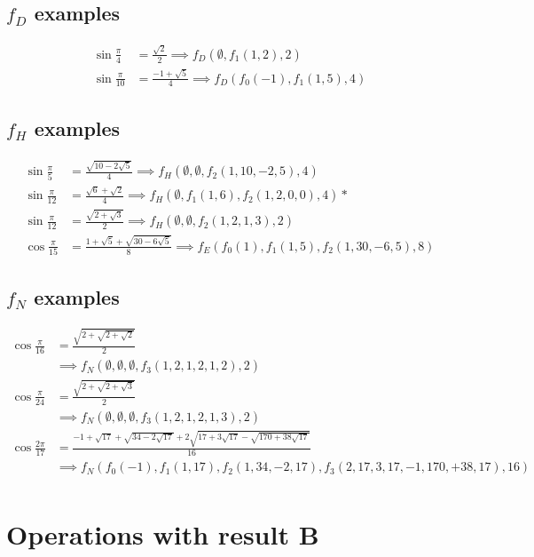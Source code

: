\documentclass{article}
\begin{document}
\subsection{$f_D$ examples}
\begin{align}
\sin{\frac{\pi}{4}}  &= \frac{\sqrt{2}}{2}    \implies f_D(\emptyset,f_1(1,2),2)\\
\sin{\frac{\pi}{10}} &= \frac{-1+\sqrt{5}}{4} \implies f_D(f_0(-1),f_1(1,5),4)
\end{align}

\subsection{$f_H$ examples}
\begin{align}
\sin{\frac{\pi}{5}}  &= \frac{\sqrt{10-2\sqrt{5}}}{4} \implies f_H(\emptyset,\emptyset,f_2(1,10,-2,5),4)\\
\sin{\frac{\pi}{12}} &= \frac{\sqrt{6} + \sqrt{2}}{4} \implies f_H(\emptyset,f_1(1,6),f_2(1,2,0,0),4) *\\
\sin{\frac{\pi}{12}} &= \frac{\sqrt{2 + \sqrt{3}}}{2} \implies f_H(\emptyset,\emptyset,f_2(1,2,1,3),2)\\
\cos{\frac{\pi}{15}} &= \frac{1+\sqrt{5}+\sqrt{30-6\sqrt{5}}}{8} \implies f_E(f_0(1),f_1(1,5),f_2(1,30,-6,5),8)
\end{align}

\subsection{$f_N$ examples}
\begin{align}
\cos{\frac{\pi}{16}} &= \frac{\sqrt{2+\sqrt{2+\sqrt{2}}}}{2}
  \\&\implies f_N(\emptyset,\emptyset,\emptyset,f_3(1,2,1,2,1,2),2) \nonumber \\
\cos{\frac{\pi}{24}} &= \frac{\sqrt{2+\sqrt{2+\sqrt{3}}}}{2}
  \\&\implies f_N(\emptyset,\emptyset,\emptyset,f_3(1,2,1,2,1,3),2) \nonumber \\
\cos{\frac{2\pi}{17}} &=
\frac{-1+\sqrt{17}+\sqrt{34-2\sqrt{17}}+2\sqrt{17+3\sqrt{17}-\sqrt{170+38\sqrt{17}}}}{16}
    \\&\implies f_N(f_0(-1),f_1(1,17),f_2(1,34,-2,17),f_3(2,17,3,17,-1,170,+38,17),16) \nonumber \\
\end{align}

\section{Operations with result B}
\end{document}

